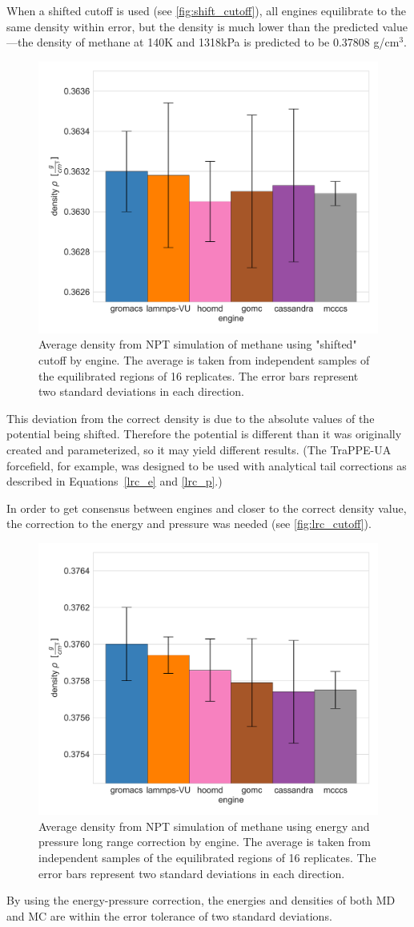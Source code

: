 When a shifted cutoff is used (see \autoref{fig:shift_cutoff}), all engines equilibrate to the same density within error, but the density is much lower than the predicted value---the density of methane at 140K and 1318kPa is predicted to be 0.37808 g/cm$^3$\cite{NISTwebbook}.
\begin{figure}[h!]
    \centering
    \includegraphics[width=0.6\linewidth,keepaspectratio]{figures/rep_study/shift_cutoff.png}
    \caption{Average density from NPT simulation of methane using "shifted" cutoff by engine. The average is taken from independent samples of the equilibrated regions of 16 replicates. The error bars represent two standard deviations in each direction.}\label{fig:shift_cutoff}
\end{figure}
This deviation from the correct density is due to the absolute values of the potential being shifted. 
Therefore the potential is different than it was originally created and parameterized, so it may yield different results.
(The TraPPE-UA forcefield, for example, was designed to be used with analytical tail corrections as described in Equations~\eqref{lrc_e} and \eqref{lrc_p}.)

In order to get consensus between engines and closer to the correct density value, the correction to the energy and pressure was needed (see \autoref{fig:lrc_cutoff}).
\begin{figure}[h!]
    \centering
    \includegraphics[width=0.6\linewidth,keepaspectratio]{figures/rep_study/lrc_cutoff.png}
    \caption{Average density from NPT simulation of methane using energy and pressure long range correction by engine. The average is taken from independent samples of the equilibrated regions of 16 replicates. The error bars represent two standard deviations in each direction.}\label{fig:lrc_cutoff}
\end{figure}
By using the energy-pressure correction, the energies and densities of both MD and MC are within the error tolerance of two standard deviations. 

